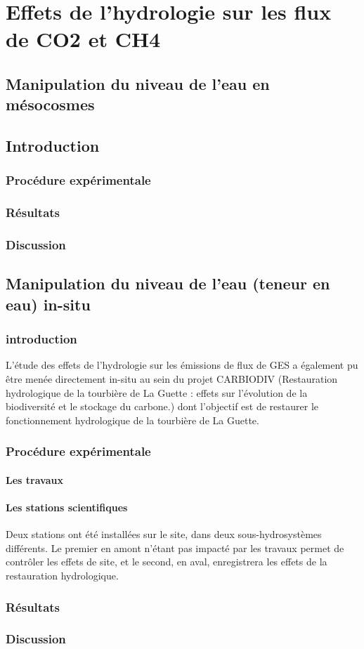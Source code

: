 \chapter{Effets de l'hydrologie sur les flux de CO2 et CH4}

\minitoc

\newpage

\section{Manipulation du niveau de l'eau en mésocosmes}
\section{Introduction}
\subsection{Procédure expérimentale}
\subsection{Résultats}
\subsection{Discussion}

\section{Manipulation du niveau de l'eau (teneur en eau) in-situ}
\subsection{introduction}
L'étude des effets de l'hydrologie sur les émissions de flux de GES a également pu être menée directement in-situ au sein du projet CARBIODIV (Restauration hydrologique de la tourbière de La Guette : effets sur l'évolution de la biodiversité et le stockage du carbone.) dont l'objectif est de restaurer le fonctionnement hydrologique de la tourbière de La Guette.
\subsection{Procédure expérimentale}
\subsubsection{Les travaux}
\subsubsection{Les stations scientifiques}
Deux stations ont été installées sur le site, dans deux sous-hydrosystèmes différents. Le premier en amont n'étant pas impacté par les travaux permet de contrôler les effets de site, et le second, en aval, enregistrera les effets de la restauration hydrologique.
\subsection{Résultats}
\subsection{Discussion}
